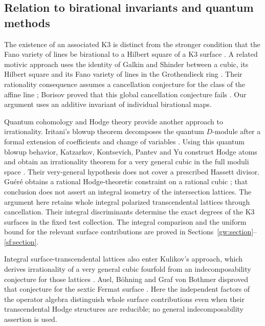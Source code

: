 \subsection{Relation to birational invariants and quantum methods}

The existence of an associated K3 is distinct from the stronger condition
that the Fano variety of lines be birational to a Hilbert square of a K3
surface \cite[Theorems~1 and~2]{Addington16}.
A related motivic approach uses the identity of Galkin and Shinder
between a cubic, its Hilbert square and its Fano variety of lines in the
Grothendieck ring \cite[Theorem~5.1]{GalkinShinder14}.
Their rationality consequence assumes a cancellation conjecture for the
class of the affine line \cite[Conjecture~2.7 and Theorem~7.5]{GalkinShinder14};
Borisov proved that this global cancellation conjecture fails
\cite[Theorem~2.12]{Borisov18}.
Our argument uses an additive invariant of individual birational maps.

Quantum cohomology and Hodge theory provide another approach to
irrationality. Iritani's blowup theorem decomposes the quantum
\(D\)-module after a formal extension of coefficients and change of
variables \cite[Theorem~1.1]{Iritani25}. Using this quantum blowup
behavior, Katzarkov, Kontsevich, Pantev and Yu construct Hodge atoms
and obtain an irrationality theorem for a very general cubic in the full
moduli space \cite[Theorem~6.8]{KKPY26}. Their very-general hypothesis
does not cover a prescribed Hassett divisor. Gu\'er\'e obtains a
rational Hodge-theoretic constraint on a rational cubic
\cite[Theorem~63]{Guere26}; that conclusion does not assert an integral
isometry of the intersection lattices.
The argument here retains whole integral polarized transcendental
lattices through cancellation. Their integral discriminants determine
the exact degrees of the K3 surfaces in the fixed test collection.
The integral comparison and the uniform bound for the relevant surface
contributions are proved in Sections~\ref{gw:section}--\ref{sf:section}.

Integral surface-transcendental lattices also enter Kulikov's approach,
which derives irrationality of a very general cubic fourfold from an
indecomposability conjecture for those lattices
\cite[Proposition~1]{Kulikov08}. Auel, B\"ohning and Graf von Bothmer
disproved that conjecture for the sextic Fermat surface
\cite[Theorem~1.2]{AuelBohningBothmer13}.
Here the independent factors of the operator algebra distinguish whole
surface contributions even when their transcendental Hodge structures
are reducible; no general indecomposability assertion is used.

